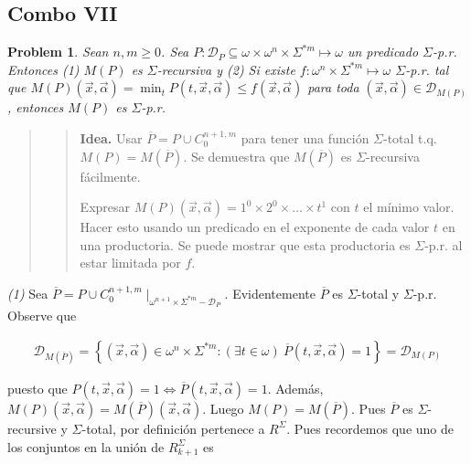 \documentclass[a4paper, 12pt]{article}
\newtheorem{problem}{Problem}
\newtheorem{problem}{Problem}
\begin{document}
\pagebreak

\subsection{Combo VII}

\begin{problem}
    Sean $n, m \geq 0$. Sea $P : \mathcal{D}_P \subseteq \omega \times
    \omega^{n} \times \Sigma^{*m} \mapsto \omega$ un predicado $\Sigma$-p.r.
    Entonces \textit{(1)} $M(P)$ es $\Sigma$-recursiva y \textit{(2)} Si existe
    $f: \omega^{n} \times \Sigma^{*m}  \mapsto \omega$ $\Sigma$-p.r.  tal que
    $M(P)(\vec{x}, \vec{\alpha}) = \min_t P(t, \vec{x}, \vec{\alpha}) \leq
    f(\vec{x}, \vec{\alpha})$ para toda $(\vec{x}, \vec{\alpha}) \in
    \mathcal{D}_{M(P)}$, entonces $M(P)$ es $\Sigma$-p.r. 
\end{problem}


\small
\begin{quote}

\begin{quote}
    \textbf{Idea.} Usar $\overline{P} = P \cup C_0^{n + 1, m}$ para tener una
    función $\Sigma$-total t.q. $M(P) = M(\overline{P})$. Se demuestra que
    $M(\overline{P})$ es $\Sigma$-recursiva fácilmente.  

    Expresar $M(P)(\vec{x}, \vec{\alpha})  = 1^{0} \times 2^{0} \times  \ldots
    \times t^{1}$ con $t$ el mínimo valor. Hacer esto usando un predicado en el
    exponente de cada valor $t$ en una productoria. Se puede mostrar que esta
    productoria es $\Sigma$-p.r. al estar limitada por $f$.
\end{quote}

\end{quote}
\normalsize


\textit{(1)} Sea $\overline{P} = P \cup C_0^{n+1, m}\mid_{\omega^{n+1} \times
\Sigma^{*m} - \mathcal{D}_{P}}$. Evidentemente $\overline{P}$ es $\Sigma$-total
y $\Sigma$-p.r. Observe que 

\begin{align*}
    \mathcal{D}_{M(\overline{P})} = \left\{ (\vec{x}, \vec{\alpha}) \in
    \omega^{n} \times \Sigma^{*m} : (\exists t \in \omega) ~ \overline{P}(t,
\vec{x}, \vec{\alpha}) = 1 \right\} = \mathcal{D}_{M(P)}
\end{align*}

puesto que $P(t, \vec{x}, \vec{\alpha}) = 1 \iff \overline{P}(t, \vec{x},
\vec{\alpha}) = 1$. Además, $M(P)(\vec{x}, \vec{\alpha}) =
M(\overline{P})(\vec{x}, \vec{\alpha}) $. Luego $M(P) = M(\overline{P})$. Pues
$\overline{P}$ es $\Sigma$-recursive y $\Sigma$-total, por definición pertenece
a $R^{\Sigma}$. Pues recordemos que uno de los conjuntos en la unión de
$R_{k+1}^{\Sigma}$ es 
\end{document}
